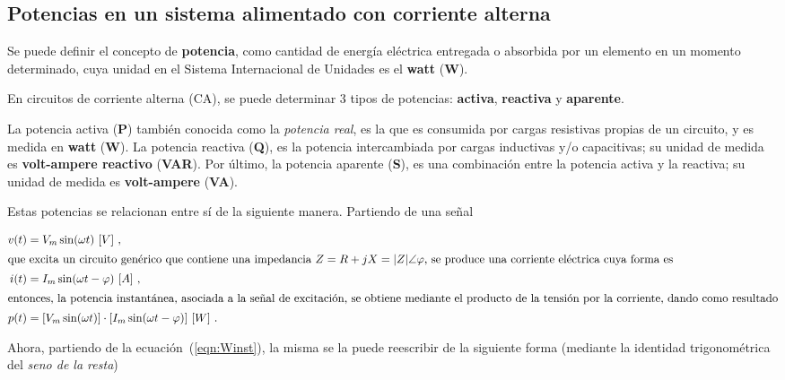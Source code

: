 \subsection{Potencias en un sistema alimentado con corriente alterna}

   Se puede definir el concepto de \textbf{potencia}, como cantidad de energía eléctrica 
  entregada o absorbida por un elemento en un momento determinado, cuya unidad en el Sistema 
  Internacional de Unidades es el \textbf{watt} (\textbf{W}).

   En circuitos de corriente alterna (CA), se puede determinar 3 tipos de potencias:
   \textbf{activa}, \textbf{reactiva} y \textbf{aparente}.

  La potencia activa (\textbf{P}) también conocida como la \textit{potencia real}, es la que
  es consumida por cargas resistivas propias de un circuito, y es medida 
  en \textbf{watt} (\textbf{W}). La potencia reactiva (\textbf{Q}), es la potencia 
  intercambiada por cargas inductivas y/o capacitivas; su unidad de medida es 
  \textbf{volt-ampere reactivo} (\textbf{VAR}). Por último, la potencia aparente (\textbf{S}),
  es una combinación entre la potencia activa y la reactiva; su unidad de medida es 
  \textbf{volt-ampere } (\textbf{VA}).

  Estas potencias se relacionan entre sí de la siguiente manera. Partiendo de una señal

        \vspace{-15pt}  
        \begin{align}
            v(t)   &= V_m \sin(\omega t)\ [V] ~, \notag \\
            \intertext{que excita un circuito genérico que contiene una impedancia 
                        $Z = R + jX = |Z| \angle \varphi$,  se produce una corriente
                        eléctrica cuya forma es}
            i(t)   &= I_m  \sin(\omega t - \varphi)\ [A] \ , \notag \\
            \intertext{entonces, la potencia instantánea, asociada a la señal de 
                excitación, se obtiene mediante el producto de la tensión por la 
                corriente, dando como resultado}
            p(t)  &= [V_m \sin(\omega t)] 
            \cdot [I_m \sin(\omega t - \varphi)]\ [W]  ~.
                            \label{eqn:Winst}
         \end{align}

      
    Ahora, partiendo de la ecuación~(\ref{eqn:Winst}), la misma se la puede reescribir de la
    siguiente forma (mediante la identidad trigonométrica del \textit{seno de la resta})

